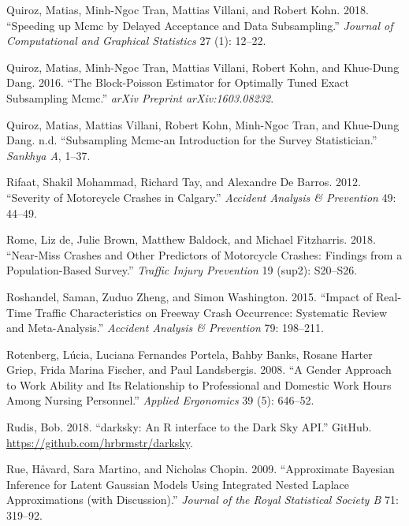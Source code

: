 \documentclass[12pt]{book}
\numberwithin{equation}{chapter}
\begin{document}
\leavevmode\hypertarget{ref-quiroz2018speeding}{}%
Quiroz, Matias, Minh-Ngoc Tran, Mattias Villani, and Robert Kohn. 2018. ``Speeding up Mcmc by Delayed Acceptance and Data Subsampling.'' \emph{Journal of Computational and Graphical Statistics} 27 (1): 12--22.

\leavevmode\hypertarget{ref-quiroz2016block}{}%
Quiroz, Matias, Minh-Ngoc Tran, Mattias Villani, Robert Kohn, and Khue-Dung Dang. 2016. ``The Block-Poisson Estimator for Optimally Tuned Exact Subsampling Mcmc.'' \emph{arXiv Preprint arXiv:1603.08232}.

\leavevmode\hypertarget{ref-quirozsubsampling}{}%
Quiroz, Matias, Mattias Villani, Robert Kohn, Minh-Ngoc Tran, and Khue-Dung Dang. n.d. ``Subsampling Mcmc-an Introduction for the Survey Statistician.'' \emph{Sankhya A}, 1--37.

\leavevmode\hypertarget{ref-rifaat2012severity}{}%
Rifaat, Shakil Mohammad, Richard Tay, and Alexandre De Barros. 2012. ``Severity of Motorcycle Crashes in Calgary.'' \emph{Accident Analysis \& Prevention} 49: 44--49.

\leavevmode\hypertarget{ref-de2018near}{}%
Rome, Liz de, Julie Brown, Matthew Baldock, and Michael Fitzharris. 2018. ``Near-Miss Crashes and Other Predictors of Motorcycle Crashes: Findings from a Population-Based Survey.'' \emph{Traffic Injury Prevention} 19 (sup2): S20--S26.

\leavevmode\hypertarget{ref-roshandel2015impact}{}%
Roshandel, Saman, Zuduo Zheng, and Simon Washington. 2015. ``Impact of Real-Time Traffic Characteristics on Freeway Crash Occurrence: Systematic Review and Meta-Analysis.'' \emph{Accident Analysis \& Prevention} 79: 198--211.

\leavevmode\hypertarget{ref-rotenberg2008gender}{}%
Rotenberg, Lúcia, Luciana Fernandes Portela, Bahby Banks, Rosane Harter Griep, Frida Marina Fischer, and Paul Landsbergis. 2008. ``A Gender Approach to Work Ability and Its Relationship to Professional and Domestic Work Hours Among Nursing Personnel.'' \emph{Applied Ergonomics} 39 (5): 646--52.

\leavevmode\hypertarget{ref-hrbrmstr}{}%
Rudis, Bob. 2018. ``darksky: An R interface to the Dark Sky API.'' GitHub. \url{https://github.com/hrbrmstr/darksky}.

\leavevmode\hypertarget{ref-Havard2009}{}%
Rue, Håvard, Sara Martino, and Nicholas Chopin. 2009. ``Approximate Bayesian Inference for Latent Gaussian Models Using Integrated Nested Laplace Approximations (with Discussion).'' \emph{Journal of the Royal Statistical Society B} 71: 319--92.
\end{document}
